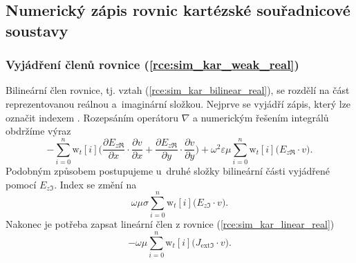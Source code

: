 \subsection{Numerický zápis rovnic kartézské souřadnicové soustavy}
\subsubsection*{Vyjádření členů rovnice (\ref{rce:sim_kar_weak_real})}
Bilineární člen rovnice, tj. vztah (\ref{rce:sim_kar_bilinear_real}), se rozdělí na část reprezentovanou reálnou a~imaginární složkou. Nejprve se vyjádří zápis, který lze označit indexem . Rozepsáním operátoru $\nabla$ a numerickým řešením integrálů obdržíme výraz
\begin{equation}
	-\sum_{i=0}^{n}\mathrm{w}_{t}[i]\bigg(\frac{\partial E_{z\Re}}{\partial x}\cdot \frac{\partial v}{\partial x} + \frac{\partial E_{z\Re}}{\partial y}\cdot \frac{\partial v}{\partial y} \bigg) + \omega^{2}\varepsilon\mu\sum_{i=0}^{n}\mathrm{w}_{t}[i]\bigg(E_{z\Re}\cdot v\bigg).
	\label{rce:sim_kar_weak_real_real_num} 
\end{equation}
Podobným způsobem postupujeme u~druhé složky bilineární části vyjádřené pomocí $E_{z\Im}$. Index se změní na 
\begin{equation}
 \omega\mu\sigma\sum_{i=0}^{n}\mathrm{w}_{t}[i]\bigg(E_{z\Im}\cdot v\bigg).
	\label{rce:sim_kar_weak_real_imag_num} 
\end{equation}
Nakonec je potřeba zapsat lineární člen z rovnice (\ref{rce:sim_kar_linear_real})
\begin{equation}
 -\omega\mu\sum_{i=0}^{n}\mathrm{w}_{t}[i]\bigg(J_{\mathrm{ext}\Im}\cdot v\bigg).
	\label{rce:sim_kar_linear_real_num} 
\end{equation}


